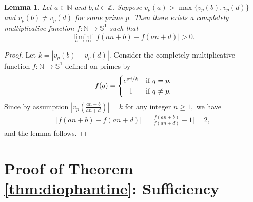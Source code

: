 \documentclass[12pt, reqno, a4paper]{amsart}
\newtheorem{lemma}{Lemma}[section]
\theoremstyle{definition}
\theoremstyle{remark}
\numberwithin{equation}{section}
\newcommand{\N}{\mathbb{N}}
\newcommand{\Z}{\mathbb{Z}}
\renewcommand{\geq}{\geqslant}
\begin{document}


 

\begin{lemma}
Let $a\in\N$ and $b,d\in\Z$. Suppose $v_{p}(a) > \max\{v_p(b),v_p(d)\}$ and $v_p(b) \neq v_p(d)$ for some prime $p.$ Then there exists a completely multiplicative function $f:\N\to \mathbb{S}^1$ such that
  \[ \liminf_{n\to\infty} |f(an+b)-f(an+d)| > 0. \]
\end{lemma}

 \begin{proof}
 Let $k=|v_p(b)-v_p(d)|.$  Consider the completely multiplicative function \( f : \mathbb{N} \to \mathbb{S}^1 \) defined on primes by
 \begin{align*}
 f(q)=
\begin{cases}
 e^{\pi i /k} &\text{if $q=p,$} \\
 \hfil 1 &\text{if $q \neq p.$}
\end{cases}
 \end{align*}
 Since by assumption $|v_p \left( \frac{an+b}{an+d}\right)|=k$ for any integer $n \geq 1,$
we have
\begin{align*}
 |f(an+b)-f(an+d)| = \bigg|\frac{f(an+b)}{f(an+d)} -1\bigg| = 2, 
\end{align*}
and the lemma follows.
 \end{proof}

\section{Proof of Theorem \ref{thm:diophantine}: Sufficiency} \label{section:thm2suff}
\end{document}
